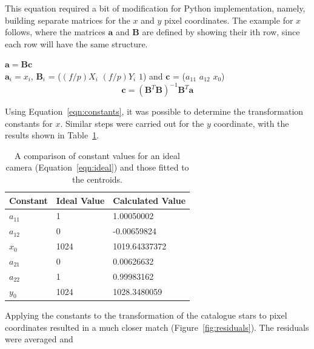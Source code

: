 \documentclass[a4paper,12pt]{article}
\begin{document}
This equation required a bit of modification for Python implementation, namely, building separate matrices for the $x$ and $y$ pixel coordinates. The example for $x$ follows, where the matrices $\mathbf{a}$ and $\mathbf{B}$ are defined by showing their ith row, since each row will have the same structure.

\begin{center}

$\mathbf{a} = \mathbf{B}\mathbf{c}$\\

$\mathbf{a}_{i} = x_{i}$, $\mathbf{B}_{i}$ = ($(f/p)X_{i}$  $(f/p)Y_{i}$   $1$) and $\mathbf{c}$ = ($a_{11}$  $a_{12}$  $x_{0}$)\\

\begin{equation}
\mathbf{c} = (\mathbf{B}^{T}\mathbf{B})^{-1}\mathbf{B}^{T}\mathbf{a}
\label{eqn:constants}
\end{equation}

\end{center}

Using Equation~\ref{eqn:constants}, it was possible to determine the transformation constants for $x$. Similar steps were carried out for the $y$ coordinate, with the results shown in Table~\ref{tab:constants}.

\begin{center}
\begin{table}[!htbp]
  \centering
  \begin{tabular}{l||l||l}
  	Constant & Ideal Value & Calculated Value \\
  	\hline
  	$a_{11}$ & 1 & 1.00050002 \\
  	$a_{12}$ & 0 & -0.00659824 \\
  	$x_{0}$ & 1024 & 1019.64337372 \\
  	$a_{21}$ & 0 & 0.00626632 \\
  	$a_{22}$ & 1 & 0.99983162 \\
  	$y_{0}$ & 1024 & 1028.3480059 \\
   \end{tabular}
    \caption{A comparison of constant values for an ideal camera (Equation~\ref{eqn:ideal}) and those fitted to the centroids.}
    \label{tab:constants}
\end{table}
\end{center}

Applying the constants to the transformation of the catalogue stars to pixel coordinates resulted in a much closer match (Figure~\ref{fig:residuals}). The residuals were averaged and 
\end{document}
